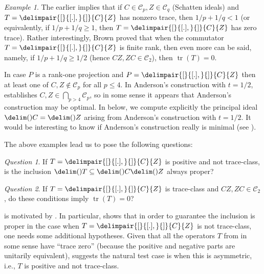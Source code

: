\documentclass[10pt,reqno]{amsart}
\theoremstyle{remark}
\newtheorem{example}[theorem]{Example}
\newtheorem{question}{Question}
\DeclareMathOperator{\trace}{tr}
\newcommand{\ideal}{\delim()}
\newcommand{\comm}{\delimpair{[}{[.],}{]}}
\newcommand{\schatten}[1]{\mathcal{C}_{#1}}
\numberwithin{equation}{section}
\begin{document}
\begin{example}
  \label{ex:brown-trace-zero}
  The earlier  implies that if $C \in \schatten{p}, Z \in \schatten{q}$ (Schatten ideals) and $T = \comm{C}{Z}$ has nonzero trace, then $1/p + 1/q < 1$ (or equivalently, if $1/p + 1/q \ge 1$, then $T = \comm{C}{Z}$ has zero trace).
  Rather interestingly, Brown proved \cite{Bro-1994-JRAM} that when the commutator $T = \comm{C}{Z}$ is finite rank, then even more can be said, namely, if $1/p + 1/q \ge 1/2$ (hence $CZ,ZC \in \schatten{2}$), then $\trace(T) = 0$.

  In case $P$ is a rank-one projection and $P = \comm{C}{Z}$ then at least one of $C,Z \notin \schatten{p}$ for all $p \le 4$.
  In Anderson's construction with $t = 1/2$, \cite[Theorem~3]{And-1977-JRAM} establishes $C,Z \in \bigcap_{p > 4} \schatten{p}$, so in some sense it appears that Anderson's construction may be optimal.
  In  below, we compute explicitly the principal ideal $\ideal{C} = \ideal{Z}$ arising from Anderson's construction with $t = 1/2$.
  It would be interesting to know if Anderson's construction really is minimal (see ).
\end{example}

The above examples lead us to pose the following questions:

\begin{question}
  \label{que:positive-always-proper}
  If $T = \comm{C}{Z}$ is positive and not trace-class, is the inclusion $\ideal{T} \subseteq \ideal{C}\ideal{Z}$ always proper?
\end{question}

\begin{question}
  \label{que:hilbert-schmidt-commutator-trace-zero}
  If $T = \comm{C}{Z}$ is trace-class and $CZ,ZC \in \schatten{2}$, do these conditions imply $\trace(T) = 0$?
\end{question}

 is motivated by .
In particular,  shows that in order to guarantee the inclusion is proper in the case when $T = \comm{C}{Z}$ is not trace-class, one needs some additional hypotheses.
Given that all the operators $T$ from  in some sense have ``trace zero'' (because the positive and negative parts are unitarily equivalent),  suggests the natural test case is when this is asymmetric, i.e., $T$ is positive and not trace-class.
\end{document}
